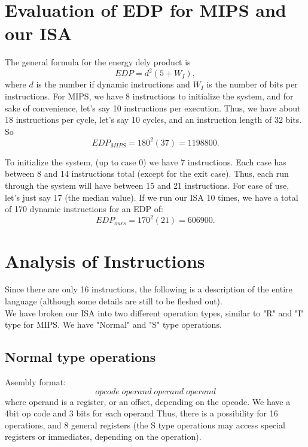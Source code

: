 \documentclass{article}
\begin{document}
\section{Evaluation of EDP for MIPS and our ISA}
The general formula for the energy dely product is
\[EDP = d^2(5+W_I),\]
where \(d\) is the number if dynamic instructions and \(W_I\) is the number of bits per instructions.
For MIPS, we have 8 instructions to initialize the system, and for sake of convenience, let's say 10 instructions per execution.  
Thus, we have about 18 instructions per cycle, let's say 10 cycles, and an instruction length of 32 bits.  So
\[EDP_{MIPS} = 180^2(37) = 1198800.\]

To initialize the system, (up to case 0) we have 7 instructions.  Each case has between 8 and 14 instructions total (except for the exit case).  
Thus, each run through the system will have between 15 and 21 instructions.  For ease of use, let's just say 17 (the median value).  If we run our ISA 10 times, we have a total of 170 dynamic instructions for an EDP of:
\[EDP_{ours} = 170^2(21) = 606900.\]

\section{Analysis of Instructions}
Since there are only 16 instructions, the following is a description of the entire language (although some details are still to be fleshed out).\\

We have broken our ISA into two different operation types, similar to "R" and "I" type for MIPS. We have "Normal" and "S" type operations.
\subsection{Normal type operations}

Asembly format: \[opcode\; operand\; operand \;operand\]
where operand is a register, or an offset, depending on the opcode.
We have a 4bit op code and 3 bits for each operand
Thus, there is a possibility for 16 operations, and 8 general registers (the S type operations may access special registers or immediates, depending on the operation).
\end{document}

